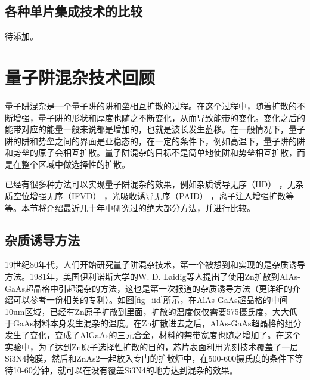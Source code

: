 \documentclass{ZJUthesis}
\begin{document}
\subsection{各种单片集成技术的比较}

待添加。

\section{量子阱混杂技术回顾}

量子阱混杂是一个量子阱的阱和垒相互扩散的过程。在这个过程中，随着扩散的不断增强，量子阱的形状和厚度也随之不断变化，从而导致能带的变化。变化之后的能带对应的能量一般来说都是增加的，也就是波长发生蓝移。在一般情况下，量子阱的阱和势垒之间的界面是亚稳态的，在一定的条件下，例如高温下，量子阱的阱和势垒的原子会相互扩散。量子阱混杂的目标不是简单地使阱和势垒相互扩散，而是在整个区域中做选择性的扩散。

已经有很多种方法可以实现量子阱混杂的效果，例如杂质诱导无序（IID） \cite{holonyak1998impurity-IID} ，无杂质空位增强无序（IFVD） \cite{si1998area-IFVD}，光吸收诱导无序（PAID） \cite{mckee1997monolithic-PAID}，离子注入增强扩散\cite{charbonneau1998photonic-implantation}等等。本节将介绍最近几十年中研究过的绝大部分方法，并进行比较。

\subsection{杂质诱导方法}

19世纪80年代，人们开始研究量子阱混杂技术，第一个被想到和实现的是杂质诱导方法。1981年，美国伊利诺斯大学的W. D. Laidig等人提出了使用Zn扩散到AlAs-GaAs超晶格中引起混杂的方法\cite{laidig1981disorder}，这也是第一次报道的杂质诱导方法（更详细的介绍可以参考一份相关的专利\cite{holonyak1983method}）。如图\ref{fig_iid}所示，在AlAs-GaAs超晶格的中间10um区域，已经有Zn原子扩散到里面，扩散的温度仅仅需要575摄氏度，大大低于GaAs材料本身发生混杂的温度。在Zn扩散进去之后，AlAs-GaAs超晶格的组分发生了变化，变成了AlGaAs的三元合金，材料的禁带宽度也随之增加了。在这个实验中，为了达到Zn原子选择性扩散的目的，芯片表面利用光刻技术覆盖了一层Si3N4掩膜，然后和ZnAs2一起放入专门的扩散炉中，在500-600摄氏度的条件下等待10-60分钟，就可以在没有覆盖Si3N4的地方达到混杂的效果。
\end{document}
